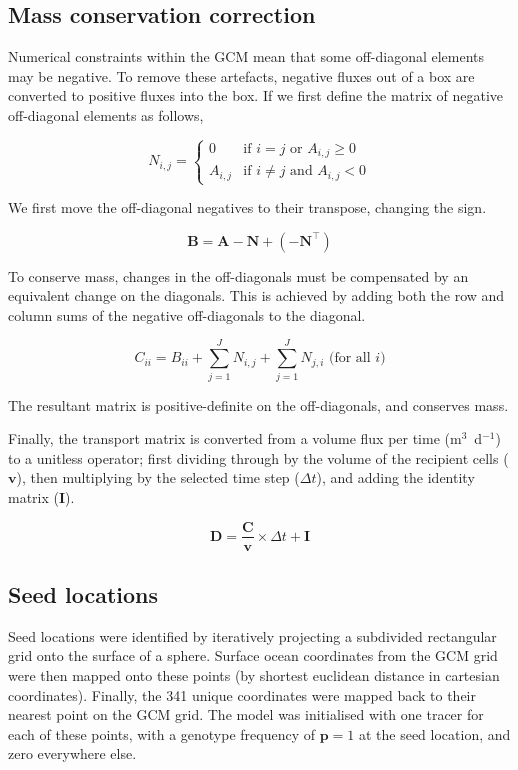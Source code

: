 \documentclass[12pt]{article}
\begin{document}
\subsection{Mass conservation correction}

Numerical constraints within the GCM mean that some off-diagonal elements may be negative. To remove these artefacts, negative fluxes out of a box are converted to positive fluxes into the box. If we first define the matrix of negative off-diagonal elements as follows,

\begin{equation}
N_{i,j} = 
\begin{cases}
0 		& \text{if $i=j$ or $A_{i,j}\ge 0$}\\
A_{i,j} 	& \text{if $i\ne j$ and $A_{i,j}<0 $}
\end{cases}
\end{equation}

We first move the off-diagonal negatives to their transpose, changing the sign.

\begin{equation}
\mathbf{B} = \mathbf{A} - \mathbf{N} + ( - \mathbf{N}^\top)
\end{equation}

To conserve mass, changes in the off-diagonals must be compensated by an equivalent change on the diagonals. This is achieved by adding both the row and column sums of the negative off-diagonals to the diagonal. 

\begin{equation}
C_{i i} = B_{i i} + \sum_{j=1}^J N_{i,j} + \sum_{j=1}^J N_{j,i} \text{ (for all $i$)}
\end{equation}

The resultant matrix is positive-definite on the off-diagonals, and conserves mass.

Finally, the transport matrix is converted from a volume flux per time (m$^3$~d$^{-1}$) to a unitless operator; first dividing through by the volume of the recipient cells ($\mathbf{v}$), then multiplying by the selected time step ($\Delta t$), and adding the identity matrix ($\mathbf{I}$).

\begin{equation}
\mathbf{D} = \frac{\mathbf{C}}{\mathbf{v}} \times \Delta t + \mathbf{I}
\end{equation}

\subsection{Seed locations}

Seed locations were identified by iteratively projecting a subdivided rectangular grid onto the surface of a sphere. Surface ocean coordinates from the GCM grid were then mapped onto these points (by shortest euclidean distance in cartesian coordinates). Finally, the 341 unique coordinates were mapped back to their nearest point on the GCM grid. The model was initialised with one tracer for each of these points, with a genotype frequency of $\mathbf{p} = 1$ at the seed location, and zero everywhere else. 




\end{document}
